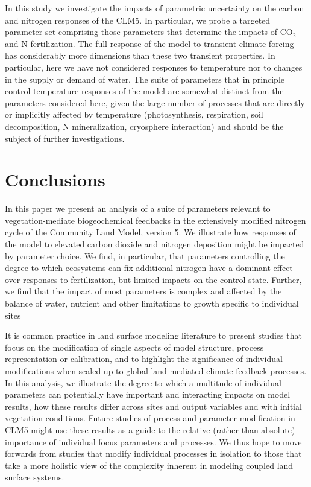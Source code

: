 \documentclass[draft,linenumbers]{agujournal}
\begin{document}
In this study we investigate the impacts of parametric uncertainty on the carbon and nitrogen responses of the CLM5. In particular, we probe a targeted parameter set comprising those parameters that determine the impacts of CO$_{2}$ and N fertilization. The full response of the model to transient climate forcing has considerably more dimensions than these two transient properties. In particular, here we have not considered responses to temperature nor to changes in the supply or demand of water. The suite of parameters that in principle control temperature responses of the model are somewhat distinct from the parameters considered here, given the large number of processes that are directly or implicitly affected by temperature (photosynthesis, respiration, soil decomposition, N mineralization, cryosphere interaction) and should be the subject of further investigations. 

\section{Conclusions}
In this paper we present an analysis of a suite of parameters relevant to vegetation-mediate biogeochemical feedbacks in the extensively modified nitrogen cycle of the Community Land Model, version 5. We illustrate how responses of the model to elevated carbon dioxide and nitrogen deposition might be impacted by parameter choice. We find, in particular, that parameters controlling the degree to which ecosystems can fix additional nitrogen have a dominant effect over responses to fertilization, but limited impacts on the control state. Further, we find that the impact of most parameters is complex and affected by the balance of water, nutrient and other limitations to growth specific to individual sites

It is common practice in land surface modeling literature to present studies that focus on the modification of single aspects of model structure, process representation or calibration, and to highlight the significance of individual modifications when scaled up to global land-mediated climate feedback processes. In this analysis, we illustrate the degree to which a multitude of individual parameters can potentially have important and interacting impacts on model results, how these results differ across sites and output variables and with initial vegetation conditions.  Future studies of process and parameter modification in CLM5 might use these results as a guide to the relative (rather than absolute) importance of individual focus parameters and processes. We thus hope to move forwards from studies that modify individual processes in isolation to those that take a more holistic view of the complexity inherent in modeling coupled land surface systems.
\end{document}
